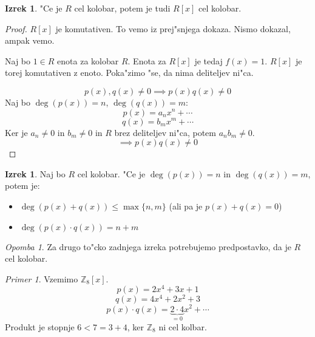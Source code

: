 \documentclass[11pt, a4paper]{article}
\theoremstyle{definition}
\newtheorem{theorem}[counter]{Izrek}
\theoremstyle{remark}
\newtheorem*{ex}{Primer}
\newtheorem*{rem}{Opomba}
\newcommand{\Z}{\mathbb{Z}}
\begin{document}
	\begin{theorem}
		"Ce je $R$ cel kolobar, potem je tudi $R[x]$ cel kolobar.
	\end{theorem}
	\begin{proof}
		$R[x]$ je komutativen. To vemo iz prej"snjega dokaza. Nismo dokazal, ampak vemo.
		
		Naj bo $1 \in R$ enota za kolobar $R$. Enota za $R[x]$ je tedaj $f(x) = 1$. $R[x]$ je torej komutativen z enoto. Poka"zimo "se, da nima deliteljev ni"ca.
		
		\[ p(x), q(x) \neq 0 \implies p(x)q(x) \neq 0 \]
		Naj bo $\deg(p(x)) = n$, $\deg(q(x)) = m$:
		\[ p(x) = a_nx^n + \cdots \]
		\[ q(x) = b_mx^m + \cdots \]
		Ker je $a_n \neq 0$ in $b_m \neq 0$ in $R$ brez deliteljev ni"ca, potem $a_nb_m \neq 0$.
		\[ \implies p(x)q(x) \neq 0 \]
	\end{proof}

	\begin{theorem}
		Naj bo $R$ cel kolobar. "Ce je $\deg(p(x)) = n$ in $\deg(q(x)) = m$, potem je:
		\begin{itemize}
			\item $\deg(p(x) + q(x)) \leq \max \lbrace n,m \rbrace$ (ali pa je $p(x)+q(x) = 0$)
			\item $\deg(p(x) \cdot q(x)) = n + m$
		\end{itemize}
	\end{theorem}
	\begin{rem}
		Za drugo to"cko zadnjega izreka potrebujemo predpostavko, da je $R$ cel kolobar.
	\end{rem}
	\begin{ex}
		Vzemimo $\Z_8[x]$.
		\[ p(x) = 2x^4 + 3x + 1 \]
		\[ q(x) = 4x^4 + 2x^2 + 3 \]
		\[ p(x) \cdot q(x) = \underbrace{2 \cdot 4}_{=0} x^2 + \cdots \]
		Produkt je stopnje $6 < 7 = 3 + 4$, ker $\Z_8$ ni cel kolbar.
	\end{ex}
\end{document}
